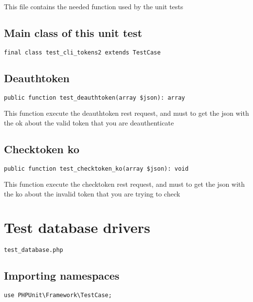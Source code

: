 \documentclass[a4paper]{book}
\begin{document}
This file contains the needed function used by the unit tests

\hypertarget{toc40}{}
\subsection{Main class of this unit test}

\begin{lstlisting}
final class test_cli_tokens2 extends TestCase
\end{lstlisting}

\hypertarget{toc41}{}
\subsection{Deauthtoken}

\begin{lstlisting}
public function test_deauthtoken(array $json): array
\end{lstlisting}

This function execute the deauthtoken rest request, and must to get the
json with the ok about the valid token that you are deauthenticate

\hypertarget{toc42}{}
\subsection{Checktoken ko}

\begin{lstlisting}
public function test_checktoken_ko(array $json): void
\end{lstlisting}

This function execute the checktoken rest request, and must to get the
json with the ko about the invalid token that you are trying to check

\hypertarget{toc43}{}
\section{Test database drivers}

\begin{lstlisting}
test_database.php
\end{lstlisting}

\hypertarget{toc44}{}
\subsection{Importing namespaces}

\begin{lstlisting}
use PHPUnit\Framework\TestCase;
\end{lstlisting}
\end{document}
